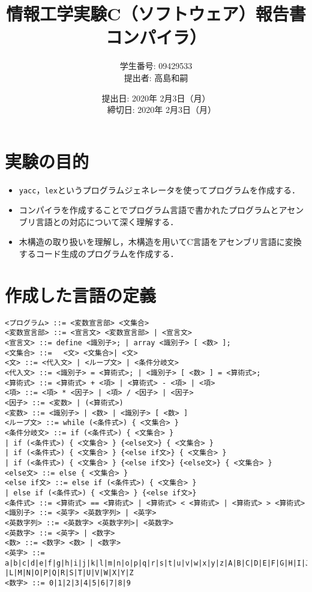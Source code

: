 \documentclass{jarticle}[11pt]
\title{{\normalsize 情報工学実験C（ソフトウェア）報告書}\\
    コンパイラ）\\
    }
\author{ 
      学生番号: 09429533 \\
      提出者: 高島和嗣
    }
\date{
      提出日: 2020年 2月3日（月） \\　%
      締切日: 2020年 2月3日（月）
    }
\begin{document}
    \maketitle
\section{実験の目的}
\begin{itemize}
\item \verb|yacc|，\verb|lex|というプログラムジェネレータを使ってプログラムを作成する．
\item コンパイラを作成することでプログラム言語で書かれたプログラムとアセンブリ言語との対応について深く理解する．
\item 木構造の取り扱いを理解し，木構造を用いてC言語をアセンブリ言語に変換するコード生成のプログラムを作成する．
\end{itemize}

\section{作成した言語の定義}
\begin{verbatim}
<プログラム> ::= <変数宣言部> <文集合>
<変数宣言部> ::= <宣言文> <変数宣言部> | <宣言文>
<宣言文> ::= define <識別子>; | array <識別子> [ <数> ];
<文集合> ::= 　<文> <文集合>| <文>
<文> ::= <代入文> | <ループ文> | <条件分岐文>
<代入文> ::= <識別子> = <算術式>; | <識別子> [ <数> ] = <算術式>;
<算術式> ::= <算術式> + <項> | <算術式> - <項> | <項>
<項> ::= <項> * <因子> | <項> / <因子> | <因子>
<因子> ::= <変数> | (<算術式>)
<変数> ::= <識別子> | <数> | <識別子> [ <数> ]
<ループ文> ::= while (<条件式>) { <文集合> }
<条件分岐文> ::= if (<条件式>) { <文集合> } 
| if (<条件式>) { <文集合> } {<else文>} { <文集合> } 
| if (<条件式>) { <文集合> } {<else if文>} { <文集合> } 
| if (<条件式>) { <文集合> } {<else if文>} {<else文>} { <文集合> } 
<else文> ::= else { <文集合> }
<else if文> ::= else if (<条件式>) { <文集合> } 
| else if (<条件式>) { <文集合> } {<else if文>}
<条件式> ::= <算術式> == <算術式> | <算術式> < <算術式> | <算術式> > <算術式> 
<識別子> ::= <英字> <英数字列> | <英字>
<英数字列> ::= <英数字> <英数字列>| <英数字>
<英数字> ::= <英字> | <数字>
<数> ::= <数字> <数> | <数字>
<英字> ::= a|b|c|d|e|f|g|h|i|j|k|l|m|n|o|p|q|r|s|t|u|v|w|x|y|z|A|B|C|D|E|F|G|H|I|J|K
|L|M|N|O|P|Q|R|S|T|U|V|W|X|Y|Z
<数字> ::= 0|1|2|3|4|5|6|7|8|9
\end{verbatim}

\end{document}
